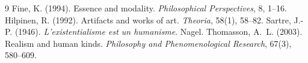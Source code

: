 \documentclass{situationist-preprint}
\begin{document}
\begin{thebibliography}{9}\small
{} Fine, K. (1994). Essence and modality. \emph{Philosophical Perspectives}, 8, 1--16.
 Hilpinen, R. (1992). Artifacts and works of art. \emph{Theoria}, 58(1), 58--82.
 Sartre, J.-P. (1946). \emph{L'existentialisme est un humanisme}. Nagel.
 Thomasson, A.~L. (2003). Realism and human kinds. \emph{Philosophy and Phenomenological Research}, 67(3), 580--609.
\end{thebibliography}
\end{document}
